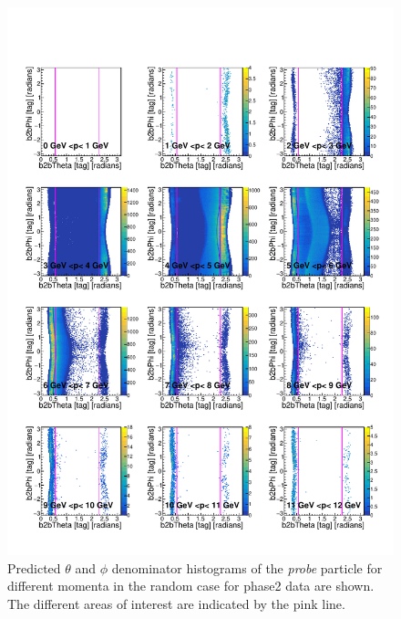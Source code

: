 \documentclass[a4paper,11pt,twosided,final,german,openbib,pdftex,listof=totoc,bibliography=totoc]{scrbook}
\begin{document}
\begin{appendix}
\begin{figure}[h!]
	\includegraphics[width=\textwidth]{Plots/RTPMRandomD_Data.pdf}
	\caption{Predicted $\theta$ and $\phi$ denominator histograms of the \textit{probe} particle for different momenta in the random case for phase2 data are shown. The different areas of interest are indicated by the pink line.}
	\label{plt:RTPMRandomD_Data}
\end{figure}



\end{appendix}
\end{document}
